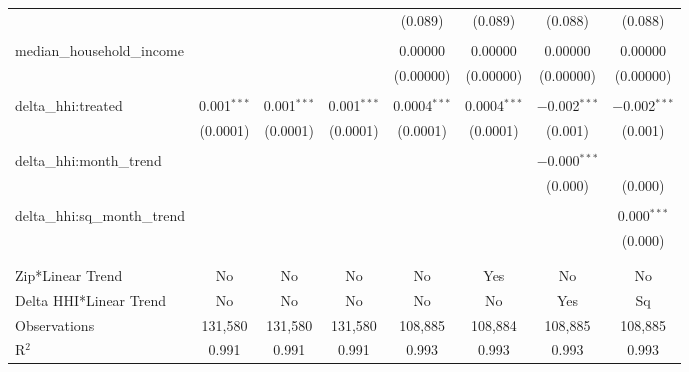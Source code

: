 \begin{table}[H]
{\begin{tabular}{@{\extracolsep{5pt}}lccccccc}
   &  &  &  & (0.089) & (0.089) & (0.088) & (0.088) \\  

   & & & & & & & \\  

  median\_household\_income &  &  &  & 0.00000 & 0.00000 & 0.00000 & 0.00000 \\  

   &  &  &  & (0.00000) & (0.00000) & (0.00000) & (0.00000) \\  

   & & & & & & & \\  

  delta\_hhi:treated & 0.001$^{***}$ & 0.001$^{***}$ & 0.001$^{***}$ & 0.0004$^{***}$ & 0.0004$^{***}$ & $-$0.002$^{***}$ & $-$0.002$^{***}$ \\  

   & (0.0001) & (0.0001) & (0.0001) & (0.0001) & (0.0001) & (0.001) & (0.001) \\  

   & & & & & & & \\  

  delta\_hhi:month\_trend &  &  &  &  &  & $-$0.000$^{***}$ &  \\  

   &  &  &  &  &  & (0.000) & (0.000) \\  

   & & & & & & & \\  

  delta\_hhi:sq\_month\_trend &  &  &  &  &  &  & 0.000$^{***}$ \\  

   &  &  &  &  &  &  & (0.000) \\  

   & & & & & & & \\  

 \hline \\[-1.8ex]  

 Zip*Linear Trend & No & No & No & No & Yes & No & No \\  

 Delta HHI*Linear Trend & No & No & No & No & No & Yes & Sq \\  

 Observations & 131,580 & 131,580 & 131,580 & 108,885 & 108,884 & 108,885 & 108,885 \\  

 R$^{2}$ & 0.991 & 0.991 & 0.991 & 0.993 & 0.993 & 0.993 & 0.993 \\  


\end{tabular}}
\end{table}

